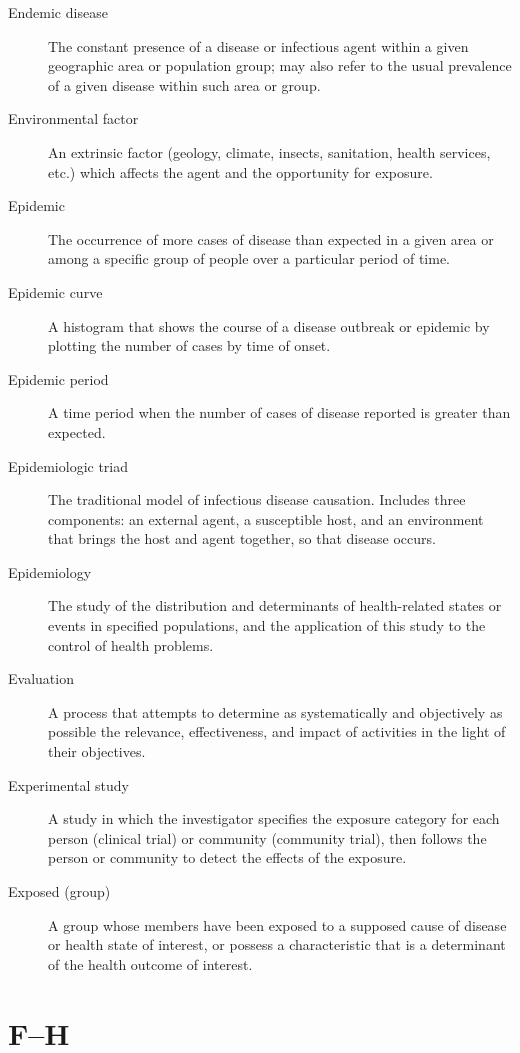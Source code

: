 \documentclass[11pt]{article}
\begin{document}
\begin{description}
\item[Endemic disease] The constant presence of a disease or
infectious agent within a given geographic area or population
group; may also refer to the usual prevalence of a given disease
within such area or group.
\item[Environmental factor] An extrinsic factor (geology,
climate, insects, sanitation, health services, etc.) which
affects the agent and the opportunity for exposure.
\item[Epidemic] The occurrence of more cases of disease than
expected in a given area or among a specific group of people over
a particular period of time.
\item[Epidemic curve] A histogram that shows the course of a
disease outbreak or epidemic by plotting the number of cases by
time of onset.
\item[Epidemic period] A time period when the number of cases of
disease reported is greater than expected.
\item[Epidemiologic triad] The traditional model of infectious
disease causation. Includes three components: an external agent,
a susceptible host, and an environment that brings the host and
agent together, so that disease occurs.
\item[Epidemiology] The study of the distribution and
determinants of health-related states or events in specified
populations, and the application of this study to the control of
health problems.
\item[Evaluation] A process that attempts to determine as
systematically and objectively as possible the relevance,
effectiveness, and impact of activities in the light of their
objectives.
\item[Experimental study] A study in which the investigator
specifies the exposure category for each person (clinical trial)
or community (community trial), then follows the person or
community to detect the effects of the exposure.
\item[Exposed (group)] A group whose members have been exposed to
a supposed cause of disease or health state of interest, or
possess a characteristic that is a determinant of the health
outcome of interest.
\end{description}

\section*{F--H}
\end{document}
